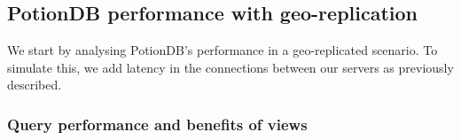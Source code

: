 \documentclass[sigplan,review,anonymous]{acmart}
\begin{document}
%

\subsection{PotionDB performance with geo-replication}

We start by analysing PotionDB's performance in a geo-replicated scenario.
To simulate this, we add latency in the connections between our servers as previously described.

\subsubsection{Query performance and benefits of views}
\end{document}
